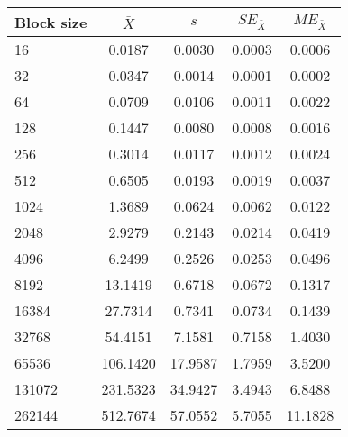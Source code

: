 \begin{tabular}{lcccc}\toprule
{\small Block size} & $\bar{X}$ & $s$ & $SE_{\bar{X}}$ & $ME_{\bar{X}}$ \\\midrule
16 & 0.0187 & 0.0030 & 0.0003 & 0.0006\\
32 & 0.0347 & 0.0014 & 0.0001 & 0.0002\\
64 & 0.0709 & 0.0106 & 0.0011 & 0.0022\\
128 & 0.1447 & 0.0080 & 0.0008 & 0.0016\\
256 & 0.3014 & 0.0117 & 0.0012 & 0.0024\\
512 & 0.6505 & 0.0193 & 0.0019 & 0.0037\\
1024 & 1.3689 & 0.0624 & 0.0062 & 0.0122\\
2048 & 2.9279 & 0.2143 & 0.0214 & 0.0419\\
4096 & 6.2499 & 0.2526 & 0.0253 & 0.0496\\
8192 & 13.1419 & 0.6718 & 0.0672 & 0.1317\\
16384 & 27.7314 & 0.7341 & 0.0734 & 0.1439\\
32768 & 54.4151 & 7.1581 & 0.7158 & 1.4030\\
65536 & 106.1420 & 17.9587 & 1.7959 & 3.5200\\
131072 & 231.5323 & 34.9427 & 3.4943 & 6.8488\\
262144 & 512.7674 & 57.0552 & 5.7055 & 11.1828\\
\bottomrule
\end{tabular}
